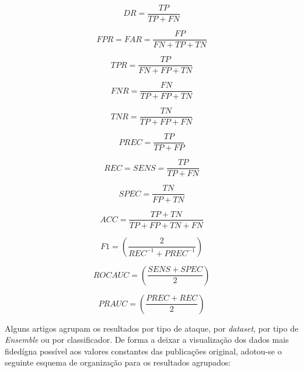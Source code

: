 \begin{equation}
DR = \frac{TP}{TP+FN}
\end{equation}

\begin{equation}
FPR = FAR = \frac{FP}{FN + TP + TN}
\end{equation}

\begin{equation}
TPR = \frac{TP}{FN + FP + TN}
\end{equation}

\begin{equation}
FNR = \frac{FN}{TP + FP + TN}
\end{equation}

\begin{equation}
TNR = \frac{TN}{TP + FP + FN}
\end{equation}

\begin{equation}
PREC = \frac{TP}{TP + FP}
\end{equation}

\begin{equation}
REC = SENS = \frac{TP}{TP + FN}
\end{equation}

\begin{equation}
SPEC = \frac{TN}{FP + TN}
\end{equation}

\begin{equation}
ACC = \frac{TP + TN}{TP + FP + TN + FN}
\end{equation}

\begin{equation}
F1 = \left(\frac{2}{REC^{-1}+PREC^{-1}}\right)
\end{equation}

\begin{equation}
ROC AUC = \left(\frac{SENS + SPEC}{2}\right)
\end{equation}

\begin{equation}
PR AUC = \left(\frac{PREC + REC}{2}\right)
\end{equation}


Alguns artigos agrupam os resultados por tipo de ataque, por \textit{dataset}, por tipo de \textit{Ensemble} ou  por classificador. De forma a deixar a visualização dos dados mais fidedígna possível aos valores constantes das publicações original, adotou-se o seguinte esquema de organização para os resultados agrupados:

